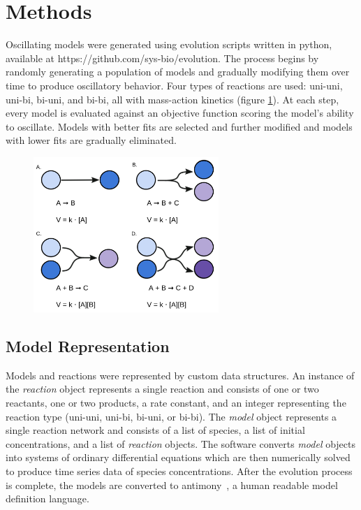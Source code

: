 \documentclass[12pt]{report}
\begin{document}
\section{Methods}



Oscillating models were generated using evolution scripts written in python, available at https://github.com/sys-bio/evolution. The process begins by randomly generating a population of models and gradually modifying them over time to produce oscillatory behavior. Four types of reactions are used: uni-uni, uni-bi, bi-uni, and bi-bi, all with mass-action kinetics (figure \ref{fig:reaction}). At each step, every model is evaluated against an objective function scoring the model's ability to oscillate. Models with better fits are selected and further modified and models with lower fits are gradually eliminated. 
\begin{figure}
    \centering
    \includegraphics[width=7cm]{images/Reactions.png}
    \label{fig:reaction}
    
\end{figure}





\subsection{Model Representation}

Models and reactions were represented by custom data structures. An instance of the \textit{reaction} object represents a single reaction and consists of one or two reactants, one or two products, a rate constant, and an integer representing the reaction type (uni-uni, uni-bi, bi-uni, or bi-bi). The \textit{model} object represents a single reaction network and consists of a list of species, a list of initial concentrations, and a list of \textit{reaction} objects. The software converts \textit{model} objects into systems of ordinary differential equations which are then numerically solved to produce time series data of species concentrations. After the evolution process is complete, the models are converted to antimony~\cite{Smith2009}, a human readable model definition language.
\end{document}
